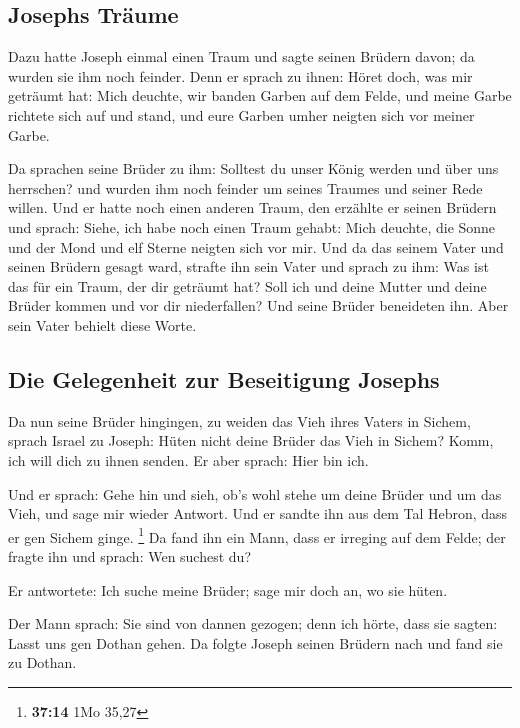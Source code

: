 \hypertarget{josephs-truxe4ume}{%
\subsection{Josephs Träume}\label{josephs-truxe4ume}}

 Dazu hatte Joseph einmal einen Traum und sagte seinen
Brüdern davon; da wurden sie ihm noch feinder.  Denn er
sprach zu ihnen: Höret doch, was mir geträumt hat:  Mich
deuchte, wir banden Garben auf dem Felde, und meine Garbe richtete sich
auf und stand, und eure Garben umher neigten sich vor meiner Garbe.

 Da sprachen seine Brüder zu ihm: Solltest du unser König
werden und über uns herrschen? und wurden ihm noch feinder um seines
Traumes und seiner Rede willen.  Und er hatte noch einen
anderen Traum, den erzählte er seinen Brüdern und sprach: Siehe, ich
habe noch einen Traum gehabt: Mich deuchte, die Sonne und der Mond und
elf Sterne neigten sich vor mir.  Und da das seinem Vater
und seinen Brüdern gesagt ward, strafte ihn sein Vater und sprach zu
ihm: Was ist das für ein Traum, der dir geträumt hat? Soll ich und deine
Mutter und deine Brüder kommen und vor dir niederfallen? 
Und seine Brüder beneideten ihn. Aber sein Vater behielt diese Worte.

\hypertarget{die-gelegenheit-zur-beseitigung-josephs}{%
\subsection{Die Gelegenheit zur Beseitigung
Josephs}\label{die-gelegenheit-zur-beseitigung-josephs}}

 Da nun seine Brüder hingingen, zu weiden das Vieh ihres
Vaters in Sichem,  sprach Israel zu Joseph: Hüten nicht
deine Brüder das Vieh in Sichem? Komm, ich will dich zu ihnen senden. Er
aber sprach: Hier bin ich.

 Und er sprach: Gehe hin und sieh, ob's wohl stehe um
deine Brüder und um das Vieh, und sage mir wieder Antwort. Und er sandte
ihn aus dem Tal Hebron, dass er gen Sichem ginge. \footnote{\textbf{37:14}
  1Mo 35,27}  Da fand ihn ein Mann, dass er irreging auf
dem Felde; der fragte ihn und sprach: Wen suchest du?

 Er antwortete: Ich suche meine Brüder; sage mir doch an,
wo sie hüten.

 Der Mann sprach: Sie sind von dannen gezogen; denn ich
hörte, dass sie sagten: Lasst uns gen Dothan gehen. Da folgte Joseph
seinen Brüdern nach und fand sie zu Dothan.


